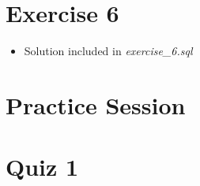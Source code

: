 \documentclass[12pt]{article}
\begin{document}
\bigskip

\section{Exercise 6}

\bigskip

\begin{itemize}
    \item Solution included in \textit{exercise\_6.sql}
\end{itemize}

\bigskip

\section{Practice Session}


\bigskip

\section{Quiz 1}

\bigskip
\end{document}
